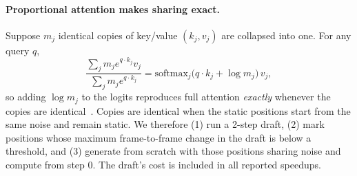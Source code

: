 \documentclass[10pt,twocolumn,letterpaper]{article}
\begin{document}
\paragraph{Proportional attention makes sharing exact.} Suppose $m_j$ identical copies of key/value $(k_j,v_j)$ are collapsed into one. For any query $q$,
\begin{equation}
\frac{\sum_j m_j e^{q\cdot k_j}v_j}{\sum_j m_j e^{q\cdot k_j}}=\mathrm{softmax}_j\big(q\cdot k_j+\log m_j\big)\,v_j ,
\end{equation}
so adding $\log m_j$ to the logits reproduces full attention \emph{exactly} whenever the copies are identical~\cite{bolya2023token}. Copies are identical when the static positions start from the same noise and remain static. We therefore (1) run a 2-step draft, (2) mark positions whose maximum frame-to-frame change in the draft is below a threshold, and (3) generate from scratch with those positions sharing noise and compute from step 0. The draft's cost is included in all reported speedups.

\begin{table}[t]
\centering\small
\caption{Speed vs.\ fidelity on the tiny model. Speedup is measured in FLOPs; ``proj.'' projects the same token fractions to a 75.6k-token video DiT. $^\dagger$Compared with full compute from the same shared starting noise.}
\label{tab:speed}
\setlength{\tabcolsep}{2.5pt}
\end{table}
\end{document}
